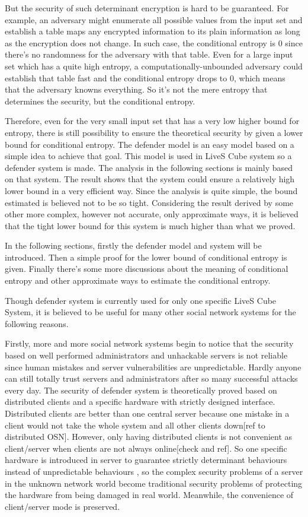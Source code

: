 \documentclass[10pt,a4paper]{article}
\begin{document}
	But the security
	of such determinant encryption is hard to be guaranteed. For example, an
	adversary might enumerate all possible values from the
	input set and establish a table maps any encrypted
	information to its plain information as long as the encryption
	does not change. In such case, the conditional entropy
	is $0$ since there's no randomness for the adversary with that table.
	Even for a large input set which has a quite high entropy, a
	computationally-unbounded adversary could establish that table
	fast and the conditional entropy drops to $0$, which means that the
	adversary knowns everything. So it's not the mere entropy that
	determines the security, but the conditional entropy.
	
	Therefore, even for the very small input set that has a very low
	higher bound for entropy, there is still possibility to ensure the
	theoretical security by given a lower bound for conditional entropy.
	The defender model is an easy model based on a simple idea to achieve that goal.
	This model is used in LiveS Cube system so a defender system is made.
	The analysis in the following sections is mainly based on that system.
	The result shows that the system could ensure a relatively high lower bound
	in a very efficient way. Since the analysis is quite simple, the
	bound estimated is believed not to be so tight. 
	Considering the result derived by some other
	more complex, however not accurate, only approximate ways, it is believed
	that the tight lower bound for this system is much higher than what we proved.
	
	In the following sections, firstly the defender model and system will be
	introduced. Then a simple proof for the lower bound of conditional entropy
	is given. Finally there's some more discussions about the meaning of
	conditional entropy and other approximate ways to estimate the conditional
	entropy.
	
	Though defender system is currently used for only one specific LiveS Cube System,
	it is believed to be useful for many other social network
	systems for the following reasons. 
	
	Firstly, more and more social network systems
	begin to notice that the security based on well performed administrators and
	unhackable servers is not reliable since human mistakes and 
	server vulnerabilities are unpredictable. Hardly anyone can still totally 
	trust servers and administrators after so many successful attacks every day.
	The security of defender system is theoretically proved based on distributed
	clients and a specific hardware with strictly designed interface. Distributed 
	clients are better than one central server because one mistake in a client would not
	take the whole system and all other clients down[ref to distributed OSN]. 
	However, only having distributed clients is not convenient as client/server
	when clients are not always online[check and ref]. So
	one specific hardware is introduced in server to
	guarantee strictly determinant behaviours instead of unpredictable behaviours
	, so the complex security problems of a server in the unknown network world
	become traditional security problems of protecting the hardware from being damaged in real world. Meanwhile,
	the convenience of client/server mode is preserved.
	
\end{document}
